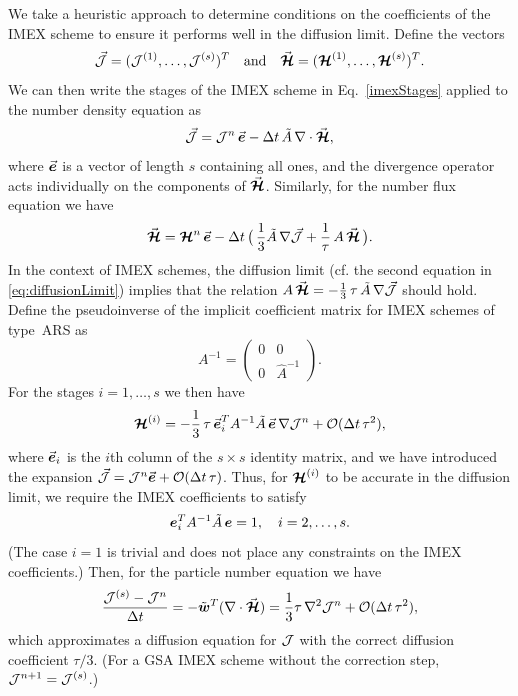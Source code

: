 We take a heuristic approach to determine conditions on the coefficients of the IMEX scheme to ensure it performs well in the diffusion limit.  
Define the vectors 
\begin{equation}
  \vec{\mathcal{J}}=(\mathcal{J}^{(1)},\ldots,\mathcal{J}^{(s)})^{T}
  \quad\text{and}\quad
  \vec{\boldsymbol{\mathcal{H}}}=(\boldsymbol{\mathcal{H}}^{(1)},\ldots,\boldsymbol{\mathcal{H}}^{(s)})^{T}.  
\end{equation}
We can then write the stages of the IMEX scheme in Eq.~\eqref{imexStages} applied to the number density equation as
\begin{equation}
  \vec{\mathcal{J}}=\mathcal{J}^{n}\,\vec{\boldsymbol{e}} - \Delta t\,\tilde{A}\,\nabla\cdot\vec{\boldsymbol{\mathcal{H}}}, 
  \label{eq:numberDensityIMEX}
\end{equation}
where $\vec{\boldsymbol{e}}$ is a vector of length $s$ containing all ones, and the divergence operator acts individually on the components of $\vec{\boldsymbol{\mathcal{H}}}$.  
Similarly, for the number flux equation we have
\begin{equation}
  \vec{\boldsymbol{\mathcal{H}}}=\boldsymbol{\mathcal{H}}^{n}\,\vec{\boldsymbol{e}}-\Delta t\,\big(\,\frac{1}{3}\tilde{A}\,\nabla\vec{\mathcal{J}}+\frac{1}{\tau}\,A\,\vec{\boldsymbol{\mathcal{H}}}\,\big).
  \label{eq:numberFluxIMEX}
\end{equation}
In the context of IMEX schemes, the diffusion limit (cf. the second equation in \eqref{eq:diffusionLimit}) implies that the relation $A\,\vec{\boldsymbol{\mathcal{H}}}=-\frac{1}{3}\,\tau\,\tilde{A}\,\nabla\vec{\mathcal{J}}$ should hold.  
Define the pseudoinverse of the implicit coefficient matrix for IMEX schemes of type~ARS as
\begin{equation*}
    A^{-1}
    =\left(
        \begin{matrix}
          0 & 0 \\ 
          0 & \hat{A}^{-1}
        \end{matrix}
      \right).
\end{equation*}
For the stages $i=1,\ldots,s$ we then have
\begin{equation}
  \boldsymbol{\mathcal{H}}^{(i)}=-\frac{1}{3}\,\tau\,\vec{\boldsymbol{e}}_{i}^{T}A^{-1}\tilde{A}\,\vec{\boldsymbol{e}}\,\nabla\mathcal{J}^{n}+\mathcal{O}(\Delta t\,\tau^{2}),
\end{equation}
where $\vec{\boldsymbol{e}}_{i}$ is the $i$th column of the $s\times s$ identity matrix, and we have introduced the expansion $\vec{\mathcal{J}}=\mathcal{J}^{n}\vec{\boldsymbol{e}}+\mathcal{O}(\Delta t\,\tau)$.  
Thus, for $\boldsymbol{\mathcal{H}}^{(i)}$ to be accurate in the diffusion limit, we require the IMEX coefficients to satisfy
\begin{equation}
  \boldsymbol{e}_{i}^{T}A^{-1}\tilde{A}\,\boldsymbol{e} = 1, \quad i=2,\ldots,s.
  \label{eq:diffusionCondition}
\end{equation}
(The case $i=1$ is trivial and does not place any constraints on the IMEX coefficients.)  
Then, for the particle number equation we have
\begin{equation}
  \frac{\mathcal{J}^{(s)}-\mathcal{J}^{n}}{\Delta t}
  =-\tilde{\boldsymbol{w}}^{T}(\nabla\cdot\vec{\boldsymbol{\mathcal{H}}})
  =\frac{1}{3}\tau\,\nabla^{2}\mathcal{J}^{n}+\mathcal{O}(\Delta t\,\tau^{2}), 
\end{equation}
which approximates a diffusion equation for $\mathcal{J}$ with the correct diffusion coefficient $\tau/3$.  
(For a GSA IMEX scheme without the correction step, $\mathcal{J}^{n+1}=\mathcal{J}^{(s)}$.)  

